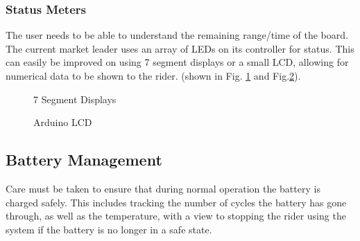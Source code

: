 \documentclass[journal,10pt]{IEEEtran}
\begin{document}
    	\subsubsection{Status Meters}
    		The user needs to be able to understand the remaining range/time of the board. The current market leader uses an array of LEDs on its controller for status. This can easily be improved on using 7 segment displays or a small LCD, allowing for numerical data to be shown to the rider. (shown in Fig. \ref{fig:7 seg} and Fig.\ref{fig:LCD}).
    		
    	\begin{figure}[H]
            \centering
            \caption{7 Segment Displays}
            \label{fig:7 seg}
        \end{figure}
    	\begin{figure}[H]
            \centering
            \caption{Arduino LCD}
            \label{fig:LCD}
        \end{figure}
    \subsection{Battery Management}
    	Care must be taken to ensure that during normal operation the battery is charged safely.
    	This includes tracking the number of cycles the battery has gone through, as well as the temperature, with a view to stopping the rider using the system if the battery is no longer in a safe state.
    	
\end{document}
